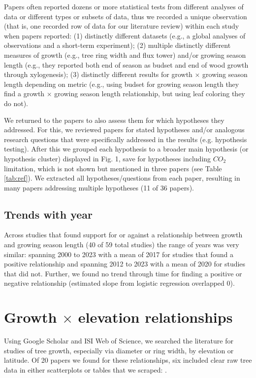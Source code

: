 \documentclass[11pt]{article}
\begin{document}
Papers often reported dozens or more statistical tests from different analyses of data or different types or subsets of data, thus we recorded a unique observation (that is, one recorded row of data for our literature review) within each study when papers reported: (1) distinctly different datasets (e.g., a global analyses of observations and a short-term experiment); (2) multiple distinctly different measures of growth (e.g., tree ring width and flux tower) and/or growing season length (e.g., they reported both end of season as budset and end of wood growth through xylogenesis); (3) distinctly different results for growth $\times$  growing season length depending on metric (e.g., using budset for growing season length they find a growth $\times$ growing season length relationship, but using leaf coloring they do not). 

We returned to the papers to also assess them for which hypotheses they addressed. For this, we reviewed papers for stated hypotheses and/or analogous research questions that were specifically addressed in the results (e.g. hypothesis testing).  After this we grouped each hypothesis to a broader main hypothesis (or hypothesis cluster) displayed in Fig. 1, save for hypotheses including $CO_2$ limitation, which is not shown but mentioned in three papers (see Table \ref{tab:ref}). We extracted all hypotheses/questions from each paper, resulting in many papers addressing multiple hypotheses (11 of 36 papers). 

\subsection*{Trends with year}
Across studies that found support for or against a relationship between growth and growing season length (40 of 59 total studies) the range of years was very similar: spanning 2000 to 2023 with a mean of 2017 for studies that found a positive relationship and spanning 2012 to 2023 with a mean of 2020 for studies that did not. Further, we found no trend through time for finding a positive or negative relationship  (estimated slope from logistic regression overlapped 0). 

\section*{Growth $\times$ elevation relationships}

Using Google Scholar and ISI Web of Science, we searched the literature for studies of tree growth, especially via diameter or ring width, by elevation or latitude. Of 20 papers we found for these relationships, six included clear raw tree data in either scatterplots or tables that we scraped: \cite{oleksyn1998growth,huang2010radial,cavin2017highest,wang2017climatic,zhu2018spatial,zhou2022altitudinal}. 
\end{document}
